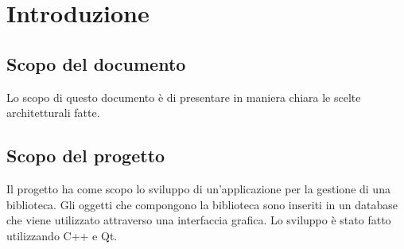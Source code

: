 \section{Introduzione}{
	\subsection{Scopo del documento}{
		Lo scopo di questo documento è di presentare in maniera chiara le scelte architetturali fatte.
	}
	\subsection{Scopo del progetto}{
		Il progetto ha come scopo lo sviluppo di un'applicazione per la gestione di una biblioteca. Gli oggetti che compongono la biblioteca sono inseriti in un database che viene utilizzato attraverso una interfaccia grafica.
		Lo sviluppo è stato fatto utilizzando C++ e Qt. 
	}
}
